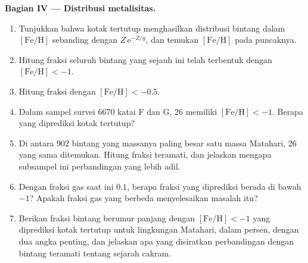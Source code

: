\begin{problem}
\medskip\noindent\textbf{Bagian IV --- Distribusi metalisitas.}
\begin{enumerate}[resume]
\item Tunjukkan bahwa kotak tertutup menghasilkan distribusi bintang dalam
  $[\mathrm{Fe/H}]$ sebanding dengan $Z\,\mathrm{e}^{-Z/y}$, dan temukan
  $[\mathrm{Fe/H}]$ pada puncaknya.
\item Hitung fraksi seluruh bintang yang sejauh ini telah terbentuk dengan
  $[\mathrm{Fe/H}] < -1$.
\item Hitung fraksi dengan $[\mathrm{Fe/H}] < -0.5$.
\item Dalam sampel survei 6670 katai F dan G, 26 memiliki
  $[\mathrm{Fe/H}] < -1$. Berapa yang diprediksi kotak tertutup?
\item Di antara 902 bintang yang massanya paling besar satu massa Matahari, 26 yang sama
  ditemukan. Hitung fraksi teramati, dan jelaskan mengapa subsampel ini
  perbandingan yang lebih adil.
\item Dengan fraksi gas saat ini $0.1$, berapa fraksi yang diprediksi
  berada di bawah $-1$? Apakah fraksi gas yang berbeda menyelesaikan
  masalah itu?
\item Berikan fraksi bintang berumur panjang dengan $[\mathrm{Fe/H}] < -1$
  yang diprediksi kotak tertutup untuk lingkungan Matahari, dalam persen,
  dengan dua angka penting, dan jelaskan apa yang disiratkan perbandingan
  dengan bintang teramati tentang sejarah cakram.
\end{enumerate}
\end{problem}
